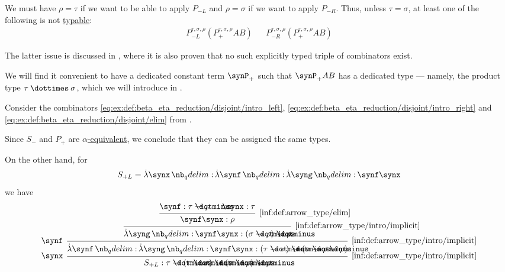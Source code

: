 \begin{example}
\begin{thmenum}
    We must have \( \rho = \tau \) if we want to be able to apply \( P_{-L} \) and \( \rho = \sigma \) if we want to apply \( P_{-R} \). Thus, unless \( \tau = \sigma \), at least one of the following is not \hyperref[def:typability]{typable}:
    \begin{align*}
      P_{-L}^{\tau,\sigma,\rho} (P_+^{\tau,\sigma,\rho} A B)
      &&
      P_{-R}^{\tau,\sigma,\rho} (P_+^{\tau,\sigma,\rho} A B)
    \end{align*}

    The latter issue is discussed in \cite{MathOF:product_type_in_simply_typed_lambda_terms}, where it is also proven that no such explicitly typed triple of combinators exist.

    We will find it convenient to have a dedicated constant term \( \synP_+ \) such that \( \synP_+ A B \) has a dedicated type --- namely, the product type \( \tau \syntimes \sigma \), which we will introduce in .

     Consider the combinators \ref{eq:ex:def:beta_eta_reduction/disjoint/intro_left}, \ref{eq:ex:def:beta_eta_reduction/disjoint/intro_right} and \ref{eq:ex:def:beta_eta_reduction/disjoint/elim} from .

    Since \( S_- \) and \( P_+ \) are \hyperref[def:lambda_term_alpha_equivalence]{\( \alpha \)-equivalent}, we conclude that they can be assigned the same types.

    On the other hand, for
    \begin{equation*}
      S_{+L} = \qabs \synx \qabs \synf \qabs \syng \synf \synx
    \end{equation*}
    we have
    \begin{equation*}
      \begin{prooftree}
        \hypo{ \synf: \tau \synimplies \rho }
        \hypo{ \synx: \tau }
        \infer2[\ref{inf:def:arrow_type/elim}]{ \synf \synx: \rho }
        \infer1[\ref{inf:def:arrow_type/intro/implicit}]{ \qabs \syng \synf \synx: (\sigma \synimplies \rho) \synimplies \rho }
        \infer[left label=\( \synf \)]1[\ref{inf:def:arrow_type/intro/implicit}]{ \qabs \synf \qabs \syng \synf \synx: (\tau \synimplies \sigma) \synimplies (\sigma \synimplies \rho \synimplies \rho) }
        \infer[left label=\( \synx \)]1[\ref{inf:def:arrow_type/intro/implicit}]{ S_{+L}: \tau \synimplies (\tau \synimplies \sigma) \synimplies (\sigma \synimplies \rho) \synimplies \rho }
      \end{prooftree}
    \end{equation*}


\end{thmenum}
\end{example}
